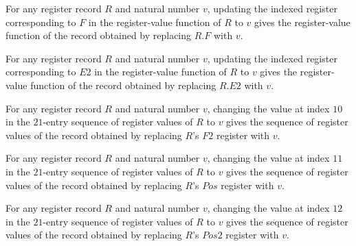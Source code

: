 \begin{lemma}
\label{Complexity.Codec.Regs.upd_F}
\leanok
{}
For any register record $R$ and natural number $v$, updating the indexed register
corresponding to $F$ in the register-value function of $R$ to $v$ gives the
register-value function of the record obtained by replacing $R.F$ with $v$.
\end{lemma}

\begin{lemma}
\label{Complexity.Codec.Regs.upd_E2}
\leanok
{}
For any register record $R$ and natural number $v$, updating the indexed register
corresponding to $E2$ in the register-value function of $R$ to $v$ gives the
register-value function of the record obtained by replacing $R.E2$ with $v$.
\end{lemma}

\begin{lemma}
\label{Complexity.Codec.Regs.upd_F2}
\leanok
{}
For any register record $R$ and natural number $v$, changing the value at index $10$ in
the $21$-entry sequence of register values of $R$ to $v$ gives the sequence of register
values of the record obtained by replacing $R$'s $F2$ register with $v$.
\end{lemma}

\begin{lemma}
\label{Complexity.Codec.Regs.upd_Pos}
\leanok
{}
For any register record $R$ and natural number $v$, changing the value at index $11$ in
the $21$-entry sequence of register values of $R$ to $v$ gives the sequence of register
values of the record obtained by replacing $R$'s $Pos$ register with $v$.
\end{lemma}

\begin{lemma}
\label{Complexity.Codec.Regs.upd_Pos2}
\leanok
{}
For any register record $R$ and natural number $v$, changing the value at index $12$ in
the $21$-entry sequence of register values of $R$ to $v$ gives the sequence of register
values of the record obtained by replacing $R$'s $Pos2$ register with $v$.
\end{lemma}

